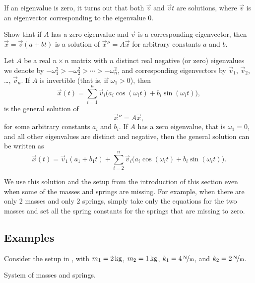\documentclass{ximera}
\begin{document}
If an eigenvalue is zero, it turns out that both $\vec{v}$ and $\vec{v} t$ are solutions, where $\vec{v}$ is an eigenvector corresponding to the eigenvalue 0.

\begin{exercise}
    Show that if $A$ has a zero eigenvalue and $\vec{v}$ is a corresponding eigenvector, then $\vec{x} = \vec{v} (a + bt)$ is a solution of ${\vec{x}}'' = A \vec{x}$ for arbitrary constants $a$ and $b$.
\end{exercise}

\begin{theorem}{}
    Let $A$ be a real $n \times n$ matrix with $n$ distinct real negative (or zero) eigenvalues we denote by $-\omega_1^2 > -\omega_2^2 > \cdots > -\omega_n^2$, and corresponding eigenvectors by $\vec{v}_1$, $\vec{v}_2$, \ldots, $\vec{v}_n$.  If $A$ is invertible (that is, if $\omega_1 > 0$), then
    \begin{equation*}
        \vec{x}(t) = \sum_{i=1}^n \vec{v}_i \bigl(a_i \cos (\omega_i t) + b_i \sin (\omega_i t) \bigr) ,
    \end{equation*}
    is the general solution of
    \begin{equation*}
        {\vec{x}}'' = A \vec{x},
    \end{equation*}
    for some arbitrary constants $a_i$ and $b_i$. If $A$ has a zero eigenvalue, that is $\omega_1 = 0$, and all other eigenvalues are distinct and negative, then the general solution can be written as
    \begin{equation*}
        \vec{x}(t) = \vec{v}_1 (a_1 + b_1 t) + \sum_{i=2}^n \vec{v}_i \bigl(a_i \cos (\omega_i t) + b_i \sin (\omega_i t) \bigr) .
    \end{equation*}
\end{theorem}

We use this solution and the setup from the introduction of this section even when some of the masses and springs are missing. For example, when there are only 2 masses and only 2 springs, simply take only the equations for the two masses and set all the spring constants for the springs that are missing to zero.

\subsection{Examples}

\begin{example}
    Consider the setup in , with $m_1 = \unit[2]{kg}$, $m_2 = \unit[1]{kg}$, $k_1 = \unitfrac[4]{N}{m}$, and $k_2 = \unitfrac[2]{N}{m}$.
    
    \begin{myfig}
        \capstart
        
        \caption{System of masses and springs.\label{sosa:twocartswallfig}}
    \end{myfig}
\end{example}
\end{document}
